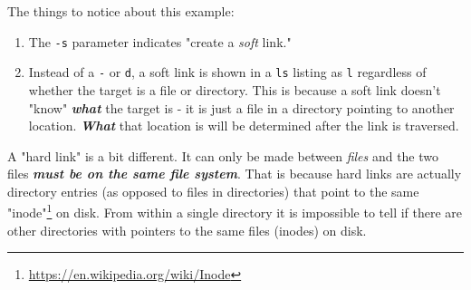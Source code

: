 \documentclass[10pt,american,]{book}
\newenvironment{Shaded}{\begin{snugshade}}{\end{snugshade}}
\newcommand{\KeywordTok}[1]{\textcolor[rgb]{0.13,0.29,0.53}{\textbf{{#1}}}}
\newcommand{\NormalTok}[1]{{#1}}
\renewcommand{\href}[2]{#2\footnote{\url{#1}}}
\numberwithin{figure}{chapter}
\renewcommand{\KeywordTok}[1]{{#1}}
\renewcommand{\NormalTok}[1]{{#1}}
\begin{document}
\begin{Shaded}
\end{Shaded}

The things to notice about this example:

\begin{enumerate}
\def\labelenumi{\arabic{enumi}.}
\item
  The \texttt{-s} parameter indicates "create a \emph{soft} link."
\item
  Instead of a \texttt{-} or \texttt{d}, a soft link is shown in a
  \texttt{ls} listing as \texttt{l} regardless of whether the target is
  a file or directory. This is because a soft link doesn't "know"
  \textbf{\emph{what}} the target is - it is just a file in a directory
  pointing to another location. \textbf{\emph{What}} that location is
  will be determined after the link is traversed.
\end{enumerate}

A "hard link" is a bit different. It can only be made
between \emph{files} and the two files \textbf{\emph{must be on the same
file system}}. That is because hard links are actually directory entries
(as opposed to files in directories) that point to the same
\href{https://en.wikipedia.org/wiki/Inode}{"inode"} on
disk. From within a single directory it is impossible to tell if there
are other directories with pointers to the same files (inodes) on disk.
\end{document}

